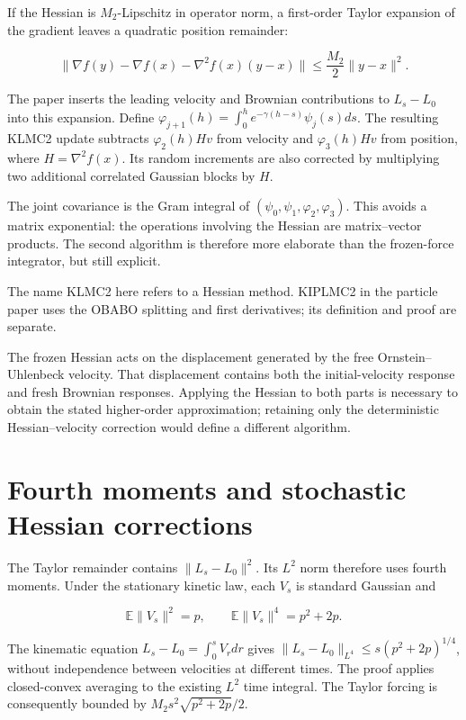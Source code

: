 \documentclass[11pt,a4paper]{report}
\begin{document}
If the Hessian is \(M_2\)-Lipschitz in operator norm, a first-order
Taylor expansion of the gradient leaves a quadratic position remainder:


\[\|\nabla f(y)-\nabla f(x)-\nabla^2f(x)(y-x)\|
\le\frac{M_2}{2}\|y-x\|^2.\]


The paper inserts the leading velocity and Brownian contributions to
\(L_s-L_0\) into this expansion. Define
\(\varphi_{j+1}(h)=\int_0^he^{-\gamma(h-s)}\psi_j(s)ds\). The resulting
KLMC2 update subtracts \(\varphi_2(h)H v\) from velocity and
\(\varphi_3(h)H v\) from position, where \(H=\nabla^2f(x)\). Its random
increments are also corrected by multiplying two additional correlated
Gaussian blocks by \(H\).




The joint covariance is the Gram integral of
\((\psi_0,\psi_1,\varphi_2,\varphi_3)\). This avoids a matrix exponential:
the operations involving the Hessian are matrix–vector products. The second
algorithm is therefore more elaborate than the frozen-force integrator, but
still explicit.




The name KLMC2 here refers to a Hessian method. KIPLMC2 in the particle
paper uses the OBABO splitting and first derivatives; its definition and proof
are separate.



The frozen Hessian acts on the displacement generated by the free Ornstein–Uhlenbeck velocity. That displacement contains both the initial-velocity response and fresh Brownian responses. Applying the Hessian to both parts is necessary to obtain the stated higher-order approximation; retaining only the deterministic Hessian–velocity correction would define a different algorithm.

\section{\texorpdfstring{Fourth moments and stochastic Hessian corrections}{Fourth moments and stochastic Hessian corrections}}


The Taylor remainder contains \(\|L_s-L_0\|^2\). Its
\(L^2\) norm therefore uses fourth moments. Under the stationary
kinetic law, each \(V_s\) is standard Gaussian and


\[\mathbb E\|V_s\|^2=p,\qquad
\mathbb E\|V_s\|^4=p^2+2p.\]


The kinematic equation \(L_s-L_0=\int_0^sV_rdr\) gives
\(\|L_s-L_0\|_{L^4}\le s(p^2+2p)^{1/4}\), without independence
between velocities at different times. The proof applies closed-convex
averaging to the existing \(L^2\) time integral. The Taylor forcing
is consequently bounded by \(M_2s^2\sqrt{p^2+2p}/2\).
\end{document}
